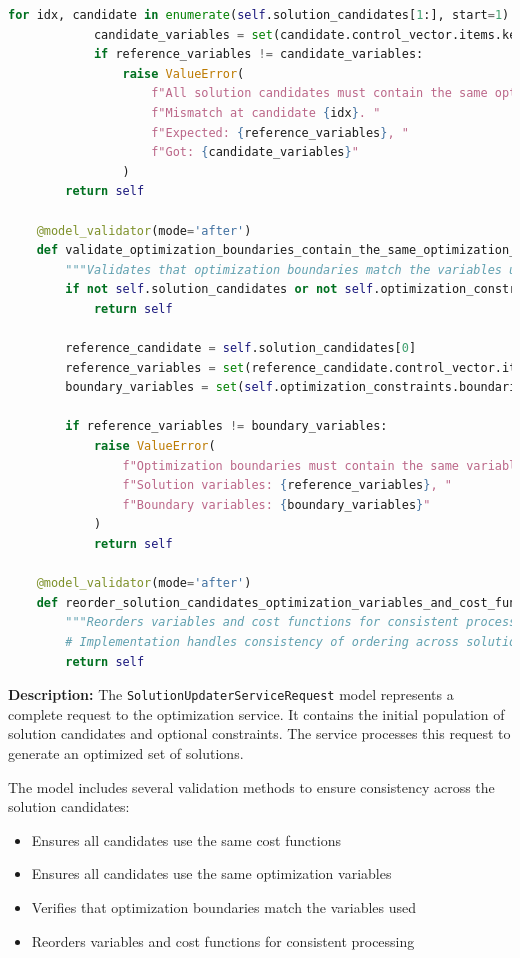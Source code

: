 \begin{lstlisting}[language=Python, caption={SolutionUpdaterServiceRequest model with complex validation logic}]
		for idx, candidate in enumerate(self.solution_candidates[1:], start=1):
			candidate_variables = set(candidate.control_vector.items.keys())
			if reference_variables != candidate_variables:
				raise ValueError(
					f"All solution candidates must contain the same optimization variables. "
					f"Mismatch at candidate {idx}. "
					f"Expected: {reference_variables}, "
					f"Got: {candidate_variables}"
				)
		return self

	@model_validator(mode='after')
	def validate_optimization_boundaries_contain_the_same_optimization_variables(self) -> 'SolutionUpdaterServiceRequest':
		"""Validates that optimization boundaries match the variables used in solutions."""
		if not self.solution_candidates or not self.optimization_constraints:
			return self

		reference_candidate = self.solution_candidates[0]
		reference_variables = set(reference_candidate.control_vector.items.keys())
		boundary_variables = set(self.optimization_constraints.boundaries.keys())

		if reference_variables != boundary_variables:
			raise ValueError(
				f"Optimization boundaries must contain the same variables as solution candidates. "
				f"Solution variables: {reference_variables}, "
				f"Boundary variables: {boundary_variables}"
			)
			return self

	@model_validator(mode='after')
	def reorder_solution_candidates_optimization_variables_and_cost_functions(self) -> 'SolutionUpdaterServiceRequest':
		"""Reorders variables and cost functions for consistent processing."""
		# Implementation handles consistency of ordering across solution candidates
		return self
\end{lstlisting}

\textbf{Description:}
The \texttt{SolutionUpdaterServiceRequest} model represents a complete request to the optimization service. It contains the initial population of solution candidates and optional constraints. The service processes this request to generate an optimized set of solutions.

The model includes several validation methods to ensure consistency across the solution candidates:
\begin{itemize}
	\item Ensures all candidates use the same cost functions
	\item Ensures all candidates use the same optimization variables
	\item Verifies that optimization boundaries match the variables used
	\item Reorders variables and cost functions for consistent processing
\end{itemize}

